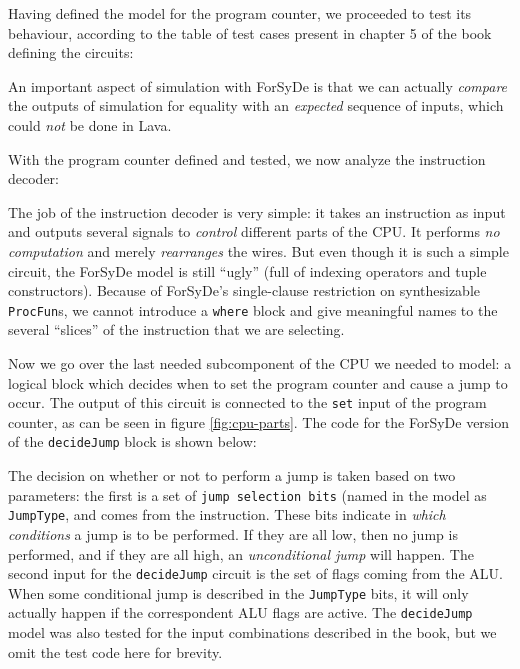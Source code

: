 \documentclass[a4paper]{article}
\begin{document}
                Having defined the model for the program counter, we proceeded to test its
                behaviour, according to the table of test cases present in chapter
                5\cite{nand2tetris-chapter-cpu} of the book defining the circuits:


                An important aspect of simulation with ForSyDe is that we can actually
                \emph{compare} the outputs of simulation for equality with an \emph{expected}
                sequence of inputs, which could \emph{not} be done in Lava.

                With the program counter defined and tested, we now analyze the instruction decoder:


                The job of the instruction decoder is very simple: it takes an instruction as input
                and outputs several signals to \emph{control} different parts of the CPU. It
                performs \emph{no computation} and merely \emph{rearranges} the wires. But even
                though it is such a simple circuit, the ForSyDe model is still ``ugly'' (full of
                indexing operators and tuple constructors). Because of ForSyDe's single-clause
                restriction on synthesizable \texttt{ProcFun}s, we cannot introduce a \texttt{where}
                block and give meaningful names to
                the several ``slices'' of the instruction that we are selecting.

                Now we go over the last needed subcomponent of the CPU we needed to model: a logical
                block which decides when to set the program counter and cause a jump to occur. The
                output of this circuit is connected to the \texttt{set} input of the program
                counter, as can be seen in figure \ref{fig:cpu-parts}. The code for the ForSyDe
                version of the \texttt{decideJump} block is shown below:


                The decision on whether or not to perform a jump is taken based on two parameters:
                the first is a set of \texttt{jump selection bits} (named in the model as
                \texttt{JumpType}, and comes from the instruction. These bits indicate in
                \emph{which conditions} a jump is to be performed. If they are all low, then no jump
                is performed, and if they are all high, an \emph{unconditional jump} will happen.
                The second input for the \texttt{decideJump} circuit is the set of flags coming from
                the ALU. When some conditional jump is described in the \texttt{JumpType} bits, it
                will only actually happen if the correspondent ALU flags are active. The
                \texttt{decideJump} model was also tested for the input combinations described in
                the book\cite{nand2tetris-book}, but we omit the test code here for brevity.
\end{document}
